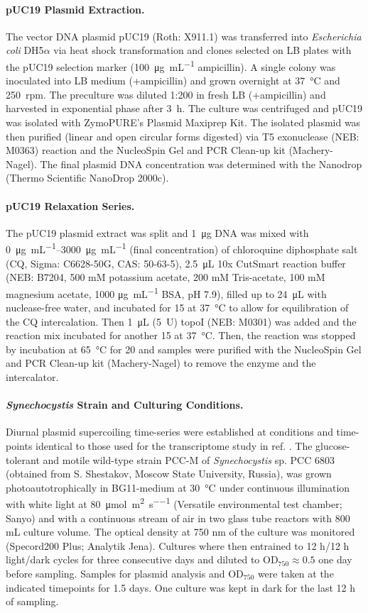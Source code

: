 \documentclass[10pt,a4]{article}
\def\cite#1{\hypersetup{citecolor=Teal}\citep{#1}} %
\newcommand{\photons}{\micro\mol\per\square\meter\per\second}
\newcommand{\ugml}{\micro\gram\per\milli\liter}
\newcommand{\scyst}{\textit{Synechocystis}}
\newcommand{\OD}{\ensuremath{\text{OD}_{750}}}
\begin{document}
\paragraph{pUC19 Plasmid Extraction.}
The vector DNA plasmid pUC19 (Roth: X911.1) was transferred into
\textit{Escherichia coli} DH5$\alpha$ via heat shock transformation
and clones selected on LB plates with the pUC19 selection marker
(\SI{100}{\ugml} ampicillin). A single colony was inoculated into LB
medium (+ampicillin) and grown overnight at \SI{37}{\celsius} and
\SI{250}{rpm}. The preculture was diluted 1:200 in fresh LB
(+ampicillin) and harvested in exponential phase after
\SI{3}{\hour}. The culture was centrifuged and pUC19 was isolated with
ZymoPURE's Plasmid Maxiprep Kit. The isolated plasmid was then
purified (linear and open circular forms digested) via T5 exonuclease
(NEB: M0363) reaction and the NucleoSpin Gel and PCR Clean-up kit
(Machery-Nagel). The final plasmid DNA concentration was determined
with the Nanodrop (Thermo Scientific NanoDrop 2000c).
%
\paragraph{pUC19 Relaxation Series.}
The pUC19 plasmid extract was split and \SI{1}{\ug} DNA was mixed with
\SIrange{0}{3000}{\ugml} (final concentration) of chloroquine
diphosphate salt (CQ, Sigma: C6628-50G, CAS: 50-63-5), \SI{2.5}{\uL}
10x CutSmart reaction buffer (NEB: B7204, 500 mM potassium acetate,
200 mM Tris-acetate, 100 mM magnesium acetate, 1000 \si{\ugml} BSA, pH
7.9), filled up to \SI{24}{\uL} with nuclease-free water, and
incubated for \SI{15}{\min} at \SI{37}{\celsius} to allow for
equilibration of the CQ intercalation. Then \SI{1}{\uL} (\SI{5}{U})
topoI (NEB: M0301) was added and the reaction mix incubated for
another \SI{15}{\min} at \SI{37}{\celsius}. Then, the reaction was
stopped by incubation at \SI{65}{\celsius} for \SI{20}{\min} and
samples were purified with the NucleoSpin Gel and PCR Clean-up kit
(Machery-Nagel) to remove the enzyme and the intercalator.

\paragraph{\scyst{} Strain and Culturing Conditions.}
Diurnal plasmid supercoiling time-series were established at
conditions and time-points identical to those used for the
transcriptome study in ref. \cite{Lehmann2013, Beck2014}.  The
glucose-tolerant and motile wild-type strain PCC-M of
\textit{Synechocystis} sp. PCC 6803 (obtained from S.  Shestakov,
Moscow State University, Russia), was grown photoautotrophically in
BG11-medium at \SI{30}{\celsius} under continuous illumination with
white light at \SI{80}{\photons} (Versatile environmental test
chamber; Sanyo) and with a continuous stream of air in two 
glass tube reactors with 800 mL culture volume.  The optical
density at 750 nm of the culture was monitored (Specord200 Plus;
Analytik Jena). Cultures where then entrained to 12 h/12 h light/dark
cycles for three consecutive days and diluted to $\OD{}\approx 0.5$
one day before sampling. Samples for plasmid analysis and \OD{} were
taken at the indicated timepoints for 1.5 days. One culture was
kept in dark for the last 12 h of sampling.
\end{document}

